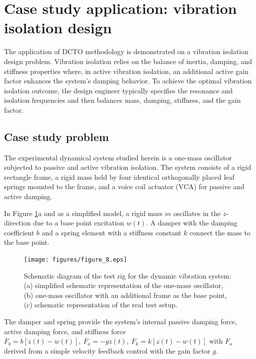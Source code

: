 \documentclass[10pt]{asme2ej}
\begin{document}
%
\section{Case study application: vibration isolation design}\label{sec:dvs}
%
The application of DCTO methodology is demonstrated on a vibration isolation design problem. 
%
Vibration isolation relies on the balance of inertia, damping, and stiffness properties where, in active vibration isolation, an additional active gain factor enhances the system’s damping behavior.
%
To achieve the optimal vibration isolation outcome, the design engineer typically specifies the resonance and isolation frequencies and then balances mass, damping, stiffness, and the gain factor. 
%

%
\subsection{Case study problem}
%
The experimental dynamical system studied herein is a one-mass oscillator subjected to passive and active vibration isolation. 
%
The system consists of a rigid rectangle frame, a rigid mass held by four identical orthogonally placed leaf springs mounted to the frame, and a voice coil actuator (VCA) for passive and active damping.
%

%
In Figure \ref{fig:schematic}a and as a simplified model, a rigid mass $m$ oscillates in the $z$-direction due to a base point excitation $w(t)$. 
%
A damper with the damping coefficient $b$ and a spring element with a stiffness constant $k$ connect the mass to the base point. 
%
\begin{figure}
	\centering
	\texttt{[image: figures/figure\_8.eps]}
	\captionsetup{width=.85\linewidth}
	\caption{Schematic diagram of the test rig for the dynamic vibration system: (a) simplified schematic representation of the one-mass oscillator, (b) one-mass oscillator with an additional frame as the base point, (c) schematic representation of the real test setup.}
	\label{fig:schematic}
\end{figure}
%
The damper and spring provide the system's internal passive damping force, active damping force, and stiffness force $F_b=b[\dot z(t)-\dot w(t)],\ F_a=-g\dot z(t),\ F_k=k[z(t)-w(t)]$ with $F_a$ derived from a simple velocity feedback control with the gain factor $g$.
%
\end{document}
